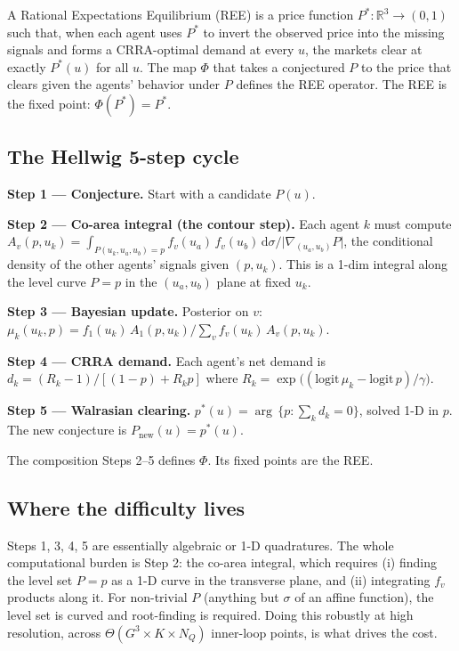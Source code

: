\documentclass[11pt]{article}
\begin{document}
A Rational Expectations Equilibrium (REE) is a price function $P^*: \mathbb R^3 \to (0,1)$
such that, when each agent uses $P^*$ to invert the observed price into the missing signals
and forms a CRRA-optimal demand at every $u$, the markets clear at exactly $P^*(u)$ for all
$u$. The map $\Phi$ that takes a conjectured $P$ to the price that clears given the agents'
behavior under $P$ defines the REE operator. The REE is the fixed point: $\Phi(P^*) = P^*$.

\subsection{The Hellwig 5-step cycle}\label{sec:hellwig}

\textbf{Step 1 — Conjecture.} Start with a candidate $P(u)$.

\textbf{Step 2 — Co-area integral (the contour step).}
Each agent $k$ must compute $A_v(p, u_k) = \int_{P(u_k,u_a,u_b)=p}\!\!\! f_v(u_a)\,f_v(u_b)\,
\mathrm d\sigma / \lvert\nabla_{(u_a,u_b)}P\rvert$, the conditional density of the other
agents' signals given $(p, u_k)$. This is a 1-dim integral along the level curve $P=p$
in the $(u_a, u_b)$ plane at fixed $u_k$.

\textbf{Step 3 — Bayesian update.} Posterior on $v$:
$\mu_k(u_k, p) = f_1(u_k)\,A_1(p, u_k)/\sum_v f_v(u_k)\,A_v(p, u_k)$.

\textbf{Step 4 — CRRA demand.} Each agent's net demand is
$d_k = (R_k-1)/[(1-p) + R_k p]$ where $R_k = \exp\bigl((\mathrm{logit}\,\mu_k - \mathrm{logit}\,p)/\gamma\bigr)$.

\textbf{Step 5 — Walrasian clearing.} $p^*(u) = \arg\,\{p : \sum_k d_k = 0\}$, solved
1-D in $p$. The new conjecture is $P_{\mathrm{new}}(u) = p^*(u)$.

The composition Steps 2--5 defines $\Phi$. Its fixed points are the REE.

\subsection{Where the difficulty lives}

Steps 1, 3, 4, 5 are essentially algebraic or 1-D quadratures. The whole computational
burden is Step 2: the co-area integral, which requires
(i) finding the level set $P=p$ as a 1-D curve in the transverse plane, and
(ii) integrating $f_v$ products along it. For non-trivial $P$ (anything but $\sigma$
of an affine function), the level set is curved and root-finding is required. Doing this
robustly at high resolution, across $\Theta(G^3 \times K \times N_Q)$ inner-loop points,
is what drives the cost.
\end{document}
